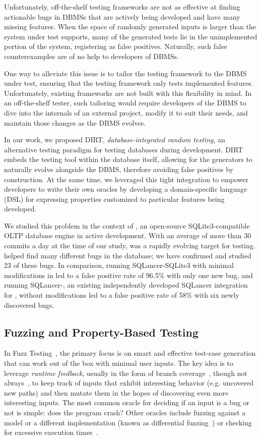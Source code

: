 Unfortunately, off-the-shelf testing frameworks are not as effective at finding
actionable bugs in DBMSs that are actively being developed and have many missing
features. When the space of randomly generated inputs is larger than the system under
test supports, many of the generated tests lie in the unimplemented portion of the
system, registering as false positives. Naturally, such false counterexamples are of no
help to developers of DBMSs.

One way to alleviate this issue is to tailor the testing framework to the DBMS under
test, ensuring that the testing framework only tests implemented features.
Unfortunately, existing frameworks are not built with this flexibility in mind. In an
off-the-shelf tester, such tailoring would require developers of the DBMS to dive into
the internals of an external project, modify it to suit their needs, and maintain those
changes as the DBMS evolves.

In our work, we proposed DIRT, \emph{database-integrated random testing}, an
alternative testing paradigm for testing databases during development. DIRT embeds the
testing tool within the database itself, allowing for the generators to naturally
evolve alongside the DBMS, therefore avoiding false positives by construction.
%
At the same time, we leveraged this tight integration to empower developers to write
their own oracles by developing a domain-specific language (DSL) for expressing
properties customized to particular features being developed.

We studied this problem in the context of \db{}, an open-source SQLite3-compatible OLTP
database engine in active development. With an average of more than 30 commits a day at
the time of our study, \db{} was a rapidly evolving target for testing. \tool{} helped
find many different bugs in the database; we have confirmed and studied 23 of these
bugs. In comparison, running SQLancer-SQLite3 with minimal modifications in \db{} led
to a false positive rate of 96.5\% with only one new bug, and running SQLancer-\db{},
an existing independently developed SQLancer integration for \db{}, without
modifications led to a false positive rate of 58\% with six newly discovered bugs.

\subsection{Fuzzing and Property-Based Testing} \label{dirt:subsec:fuzz-pbt}

In Fuzz Testing~\cite{fuzzingbook2024}, the primary focus is on smart and effective
test-case generation that can work out of the box with minimal user inputs. The key
idea is to leverage {\em runtime feedback}, usually in the form of branch
coverage~\cite{aflplusplus,AFLFast}, though not always~\cite{FuzzFactory}, to keep
track of inputs that exhibit interesting behavior (e.g. uncovered new paths) and then
mutate them in the hopes of discovering even more interesting inputs. The most common
oracle for deciding if an input is a bug or not is simple: does the program crash?
Other oracles include fuzzing against a model or a different implementation (known as
differential fuzzing~\cite{pbtpractice, apollo}) or checking for excessive execution
times~\cite{PerfFuzz}.


